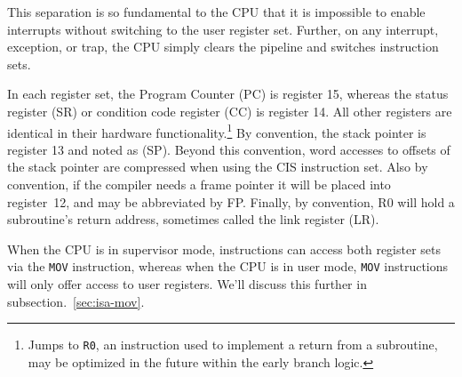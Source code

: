 \documentclass{gqtekspec}
\begin{document}
This separation is so fundamental to the CPU that it is impossible to enable
interrupts without switching to the user register set.   Further, on any
interrupt, exception, or trap, the CPU simply clears the pipeline and switches
instruction sets.

In each register set, the Program Counter (PC) is register 15, whereas
the status register (SR) or condition code register (CC) is register 14.  All
other registers are identical in their hardware functionality.\footnote{Jumps
to {\tt R0}, an instruction used to implement a return from a subroutine, may
be optimized in the future within the early branch logic.} By convention, the
stack pointer is register 13 and noted as (SP).  Beyond this convention, 
word accesses to offsets of the stack pointer are compressed when using the
CIS instruction set.  Also by convention, if the compiler needs a frame
pointer it will be placed into register~12, and may be abbreviated by FP. 
Finally, by convention, R0 will hold a subroutine's return address, sometimes
called the link register (LR).

When the CPU is in supervisor mode, instructions can access both register sets
via the {\tt MOV} instruction, whereas when the CPU is in user mode, {\tt MOV}
instructions will only offer access to user registers.  We'll discuss this
further in subsection.~\ref{sec:isa-mov}.
\end{document}
